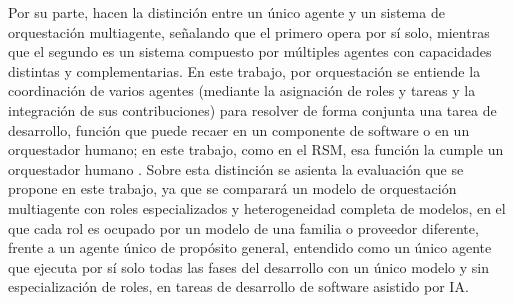 Por su parte, \textcite{guo2024llmmassurvey} hacen la distinción entre un único agente y un sistema de orquestación multiagente, señalando que el primero opera por sí solo, mientras que el segundo es un sistema compuesto por múltiples agentes con capacidades distintas y complementarias. En este trabajo, por orquestación se entiende la coordinación de varios agentes (mediante la asignación de roles y tareas y la integración de sus contribuciones) para resolver de forma conjunta una tarea de desarrollo, función que puede recaer en un componente de software o en un orquestador humano; en este trabajo, como en el RSM, esa función la cumple un orquestador humano \parencite{fernandezyfernandez2026rsm}. Sobre esta distinción se asienta la evaluación que se propone en este trabajo, ya que se comparará un modelo de orquestación multiagente con roles especializados y heterogeneidad completa de modelos, en el que cada rol es ocupado por un modelo de una familia o proveedor diferente, frente a un agente único de propósito general, entendido como un único agente que ejecuta por sí solo todas las fases del desarrollo con un único modelo y sin especialización de roles, en tareas de desarrollo de software asistido por IA.

